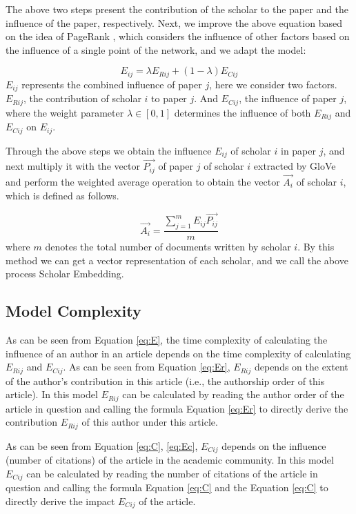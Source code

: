 \documentclass[conference]{IEEEtran}
\begin{document}
The above two steps present the contribution of the scholar to the paper and the influence of the paper, respectively. Next, we improve the above equation based on the idea of PageRank \cite{ilprints422}, which considers the influence of other factors based on the influence of a single point of the network, and we adapt the model:

\begin{equation}\label{eq:E}
   E_{ij} = \lambda E_{Rij} + (1-\lambda)E_{Cij}
\end{equation}
\(E_{ij}\) represents the combined influence of paper \(j\), here
we consider two factors. \(E_{Rij}\), the contribution of scholar \(i\) to paper
\(j\). And \(E_{Cij}\), the influence of paper \(j\),
where the weight parameter \(\lambda \in [0, 1]\) determines the influence of both
\(E_{Rij}\) and \(E_{Cij}\) on \(E_{ij}\).

Through the above steps we obtain the influence \(E_{ij}\) of scholar
\(i\) in paper \(j\), and next multiply it with the vector
\(\vec{P_{ij}}\) of paper \(j\) of scholar \(i\) extracted by GloVe
and perform the weighted average operation to obtain the vector
\(\vec{A_i}\) of scholar \(i\), which is defined as follows.

\begin{equation}\label{eq:A}
    \vec{A_i} = \frac{\sum_{j=1}^{m} E_{ij} \vec{P_{ij}}}{m}
\end{equation}
where \(m\) denotes the total number of documents written by scholar
\(i\). By this method we can get a vector representation of each
scholar, and we call the above process Scholar Embedding.

\subsection{Model Complexity}
As can be seen from Equation \ref{eq:E}, the time complexity of calculating the influence of an author in an article depends on the time complexity of calculating
\(E_{Rij}\) and \(E_{Cij}\). As can be seen from
Equation \ref{eq:Er}, \(E_{Rij}\) depends on the extent of the author's
contribution in this article (i.e., the authorship order of this
article). In this model \(E_{Rij}\) can be calculated by reading the
author order of the article in question and calling the formula
Equation \ref{eq:Er} to directly derive the contribution \(E_{Rij}\) of
this author under this article.

As can be seen from Equation \ref{eq:C}, \ref{eq:Ec},
\(E_{Cij}\) depends on the influence (number of citations) of the
article in the academic community. In this model \(E_{Cij}\) can be
calculated by reading the number of citations of the article in question
and calling the formula Equation \ref{eq:C} and the
Equation \ref{eq:C} to directly derive the impact \(E_{Cij}\) of the
article.
\end{document}
